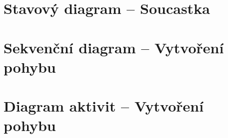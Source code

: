 \newpage
\section{Stavový diagram – Soucastka}


\newpage
\section{Sekvenční diagram – Vytvoření pohybu}


\newpage
\section{Diagram aktivit – Vytvoření pohybu}

